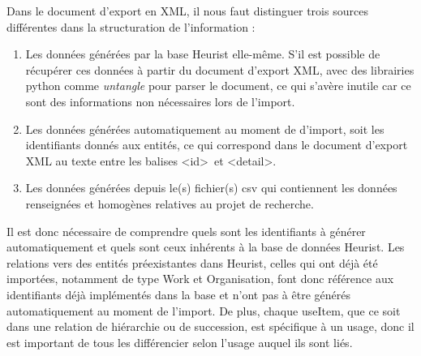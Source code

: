 \documentclass[a4paper,12pt,twoside]{book}
\begin{document}
Dans le document d'export en XML, il nous faut distinguer trois sources différentes dans la structuration de l'information :
\begin{enumerate}
    \item Les données générées par la base Heurist elle-même. S'il est possible de récupérer ces données à partir du document d'export XML, avec des librairies python comme \textit{untangle} pour parser le document, ce qui s'avère inutile car ce sont des informations non nécessaires lors de l'import.
    \item Les données générées automatiquement au moment de d'import, soit les identifiants donnés aux entités, ce qui correspond dans le document d'export XML au texte entre les balises \textless id\textgreater~et \textless detail\textgreater .
    \item Les données générées depuis le(s) fichier(s) csv qui contiennent les données renseignées et homogènes relatives au projet de recherche.
\end{enumerate}
Il est donc nécessaire de comprendre quels sont les identifiants à générer automatiquement et quels sont ceux inhérents à la base de données Heurist. Les relations vers des entités préexistantes dans Heurist, celles qui ont déjà été importées, notamment de type \og Work\fg{} et \og Organisation\fg{}, font donc référence aux identifiants déjà implémentés dans la base et n'ont pas à être générés automatiquement au moment de l'import. De plus, chaque \og useItem\fg{}, que ce soit dans une relation de hiérarchie ou de succession, est spécifique à un usage, donc il est important de tous les différencier selon l’usage auquel ils sont liés. \\
\end{document}
